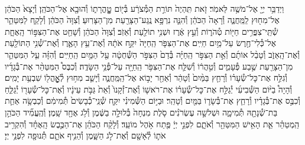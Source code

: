\documentclass[twoside, openany, parskip=half, 11pt]{book}
\begin{document}
\begin{footnotesize}
\begin{multicols}{2}
\\
וַיְדַבֵּ֥ר יְיָ֖ אֶל־מֹשֶׁ֥ה לֵּאמֹֽר׃ זֹ֤את תִּֽהְיֶה֙ תּוֹרַ֣ת הַמְּ֯צֹרָ֔ע בְּ֯י֖וֹם טׇׇׇׇׇׇׇׇׇׇׇׇׇׇֽהֳרָת֑וֹ וְ֯הוּבָ֖א אֶל־הַכֹּהֵֽן׃ וְ֯יָצָא֙ הַכֹּהֵ֔ן אֶל־מִח֖וּץ לַֽמַּֽחֲנֶ֑ה וְ֯רָאָה֙ הַכֹּהֵ֔ן וְ֯הִנֵּ֛ה נִרְפָּ֥א נֶֽגַע־הַצָּרַ֖עַת מִן־הַצָּרֽוּעַ׃ וְ֯צִוָּה֙ הַכֹּהֵ֔ן וְ֯לָקַ֧ח לַמִּטַּהֵ֛ר שְׁ֯תֵּֽי־צִפֳּרִ֥ים חַיּ֖וֹת טְ֯הֹר֑וֹת וְ֯עֵ֣ץ אֶ֔רֶז וּשְׁנִ֥י תוֹלַ֖עַת וְ֯אֵזֹֽב׃ וְ֯צִוָּה֙ הַכֹּהֵ֔ן וְ֯שָׁחַ֖ט אֶת־הַצִּפּ֣וֹר הָֽאֶחָ֑ת אֶל־כְּ֯לִי־חֶ֖רֶשׂ עַל־מַ֥יִם חַיִּֽים׃  אֶת־הַצִּפֹּ֤ר הַֽחַיָּה֙ יִקַּ֣ח אֹתָ֔הּ וְ֯אֶת־עֵ֥ץ הָאֶ֛רֶז וְ֯אֶת־שְׁ֯נִ֥י הַתּוֹלַ֖עַת וְ֯אֶת־הָֽאֵזֹ֑ב וְ֯טָבַ֨ל אוֹתָ֜ם וְ֯אֵ֣ת הַצִּפֹּ֣ר הַֽחַיָּ֗ה בְּ֯דַם֙ הַצִּפֹּ֣ר הַשְּׁ֯חֻטָ֔ה עַ֖ל הַמַּ֥יִם הַֽחַיִּֽים׃ וְ֯הִזָּ֗ה עַ֧ל הַמִּטַּהֵ֛ר מִן־הַצָּרַ֖עַת שֶׁ֣בַע פְּ֯עָמִ֑ים וְ֯טִ֣הֲר֔וֹ וְ֯שִׁלַּ֛ח אֶת־הַצִּפֹּ֥ר הַֽחַיָּ֖ה עַל־פְּ֯נֵ֥י הַשָּׂדֶֽה׃ וְ֯כִבֶּס֩ הַמִּטַּהֵ֨ר אֶת־בְּ֯גָדָ֜יו וְ֯גִלַּ֣ח אֶת־כׇּל־שְׂ֯עָר֗וֹ וְ֯רָחַ֤ץ בַּמַּ֨יִם֙ וְ֯טָהֵ֔ר וְ֯אַחַ֖ר יָב֣וֹא אֶל־הַֽמַּֽחֲנֶ֑ה וְ֯יָשַׁ֛ב מִח֥וּץ לְ֯אׇׇׇׇׇׇׇׇׇׇֽהֳל֖וֹ שִׁבְעַ֥ת יָמִֽים׃ וְ֯הָיָה֩ בַיּ֨וֹם הַשְּׁ֯בִיעִ֜י יְ֯גַלַּ֣ח אֶת־כׇּל־שְׂ֯עָר֗וֹ אֶת־רֹאשׁ֤וֹ וְ֯אֶת־זְ֯קָנוֹ֙ וְ֯אֵת֙ גַּבֹּ֣ת עֵינָ֔יו וְ֯אֶת־כׇּל־שְׂ֯עָר֖וֹ יְ֯גַלֵּ֑חַ וְ֯כִבֶּ֣ס אֶת־בְּ֯גָדָ֗יו וְ֯רָחַ֧ץ אֶת־בְּ֯שָׂר֛וֹ בַּמַּ֖יִם וְ֯טָהֵֽר׃  וּבַיּ֣וֹם הַשְּׁ֯מִינִ֗י יִקַּ֤ח שְׁ֯נֵֽי־כְ֯בָשִׂים֙ תְּ֯מִימִ֔ם וְ֯כַבְשָׂ֥ה אַחַ֛ת בַּת־שְׁ֯נָתָ֖הּ תְּ֯מִימָ֑ה וּשְׁלשָׁ֣ה עֶשְׂרֹנִ֗ים סֹ֤לֶת מִנְחָה֙ בְּ֯לוּלָ֣ה בַשֶּׁ֔מֶן וְ֯לֹ֥ג אֶחָ֖ד שָֽׁמֶן׃ וְ֯הֶֽעֱמִ֞יד הַכֹּהֵ֣ן הַֽמְטַהֵ֗ר אֵ֛ת הָאִ֥ישׁ הַמִּטַּהֵ֖ר וְ֯אֹתָ֑ם לִפְנֵ֣י יְיָ֔ פֶּ֖תַח אֹ֥הֶל מוֹעֵֽד׃ וְ֯לָקַ֨ח הַכֹּהֵ֜ן אֶת־הַכֶּ֣בֶשׂ הָֽאֶחָ֗ד וְ֯הִקְרִ֥יב אֹת֛וֹ לְ֯אָשָׁ֖ם וְ֯אֶת־לֹ֣ג הַשָּׁ֑מֶן וְ֯הֵנִ֥יף אֹתָ֛ם תְּ֯נוּפָ֖ה לִפְנֵ֥י יְיָ׃


\end{multicols}
\end{footnotesize}
\end{document}
